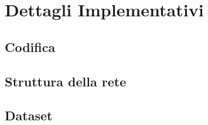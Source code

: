 
\chapter{Dettagli Implementativi}\label{chp:implementation-details}

\section{Codifica}

\section{Struttura della rete}

\section{Dataset}
